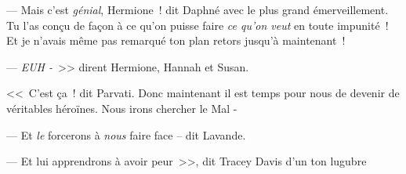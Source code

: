--- Mais c'est \emph{génial}, Hermione~! dit Daphné avec le plus grand émerveillement. Tu l'as conçu de façon à ce qu'on puisse faire \emph{ce qu'on veut} en toute impunité~! Et je n'avais même pas remarqué ton plan retors jusqu'à maintenant~!

--- \emph{EUH -}~>> dirent Hermione, Hannah et Susan.

<<~C'est ça~! dit Parvati. Donc maintenant il est temps pour nous de devenir de véritables héroïnes. Nous irons chercher le Mal -

--- Et \emph{le} forcerons à \emph{nous} faire face -- dit Lavande.

--- Et lui apprendrons à avoir peur~>>, dit Tracey Davis d'un ton lugubre
